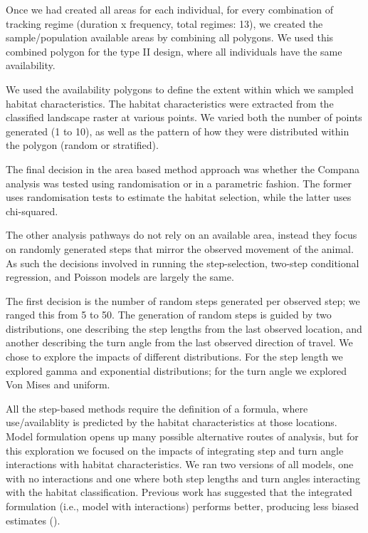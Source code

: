 \documentclass[10pt,a4paper]{article}
\begin{document}
Once we had created all areas for each individual, for every combination of tracking regime (duration x frequency, total regimes: 13), we created the sample/population available areas by combining all polygons.
We used this combined polygon for the type II design, where all individuals have the same availability.

We used the availability polygons to define the extent within which we sampled habitat characteristics.
The habitat characteristics were extracted from the classified landscape raster at various points.
We varied both the number of points generated (1 to 10), as well as the pattern of how they were distributed within the polygon (random or stratified).

The final decision in the area based method approach was whether the Compana analysis was tested using randomisation or in a parametric fashion.
The former uses randomisation tests to estimate the habitat selection, while the latter uses chi-squared.

The other analysis pathways do not rely on an available area, instead they focus on randomly generated steps that mirror the observed movement of the animal.
As such the decisions involved in running the step-selection, two-step conditional regression, and Poisson models are largely the same.

The first decision is the number of random steps generated per observed step; we ranged this from 5 to 50.
The generation of random steps is guided by two distributions, one describing the step lengths from the last observed location, and another describing the turn angle from the last observed direction of travel.
We chose to explore the impacts of different distributions.
For the step length we explored gamma and exponential distributions; for the turn angle we explored Von Mises and uniform.

All the step-based methods require the definition of a formula, where use/availablity is predicted by the habitat characteristics at those locations.
Model formulation opens up many possible alternative routes of analysis, but for this exploration we focused on the impacts of integrating step and turn angle interactions with habitat characteristics.
We ran two versions of all models, one with no interactions and one where both step lengths and turn angles interacting with the habitat classification.
Previous work has suggested that the integrated formulation (i.e., model with interactions) performs better, producing less biased estimates ().
\end{document}
